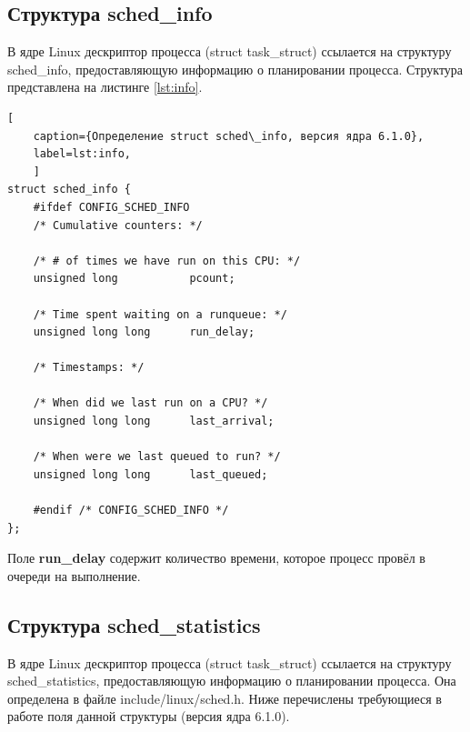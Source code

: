 \subsection{Структура sched\_info}

В ядре Linux дескриптор процесса (struct task\_struct) ссылается на структуру sched\_info, предоставляющую информацию о планировании процесса. Структура представлена на листинге \ref{lst:info}. \cite{sched}

\begin{lstlisting}[
	caption={Определение struct sched\_info, версия ядра 6.1.0},
	label=lst:info,
	]
struct sched_info {
	#ifdef CONFIG_SCHED_INFO
	/* Cumulative counters: */
	
	/* # of times we have run on this CPU: */
	unsigned long			pcount;
	
	/* Time spent waiting on a runqueue: */
	unsigned long long		run_delay;
	
	/* Timestamps: */
	
	/* When did we last run on a CPU? */
	unsigned long long		last_arrival;
	
	/* When were we last queued to run? */
	unsigned long long		last_queued;
	
	#endif /* CONFIG_SCHED_INFO */
};
\end{lstlisting}

Поле \textbf{run\_delay} содержит количество времени, которое процесс провёл в очереди на выполнение.



\subsection{Структура sched\_statistics}

В ядре Linux дескриптор процесса (struct task\_struct) ссылается на структуру sched\_statistics, предоставляющую информацию о планировании процесса. Она определена в файле include/linux/sched.h. Ниже перечислены требующиеся в работе поля данной структуры (версия ядра 6.1.0). \cite{sched}

